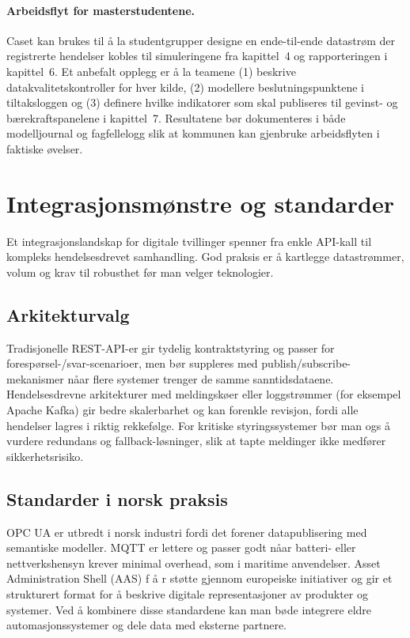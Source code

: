 \paragraph{Arbeidsflyt for masterstudentene.} Caset kan brukes til å la studentgrupper designe en ende-til-ende datastrøm der registrerte hendelser kobles til simuleringene fra kapittel~4 og rapporteringen i kapittel~6. Et anbefalt opplegg er å la teamene (1) beskrive datakvalitetskontroller for hver kilde, (2) modellere beslutningspunktene i tiltaksloggen og (3) definere hvilke indikatorer som skal publiseres til gevinst- og bærekraftspanelene i kapittel~7. Resultatene bør dokumenteres i både modelljournal og fagfellelogg slik at kommunen kan gjenbruke arbeidsflyten i faktiske øvelser.

\section{Integrasjonsmønstre og standarder}
Et integrasjonslandskap for digitale tvillinger spenner fra enkle API-kall til kompleks hendelsesdrevet samhandling. God praksis er  å kartlegge datastrømmer, volum og krav til robusthet før man velger teknologier.

\subsection{Arkitekturvalg}
Tradisjonelle REST-API-er gir tydelig kontraktstyring og passer for forespørsel-/svar-scenarioer, men bør suppleres med publish/subscribe-mekanismer nåar flere systemer trenger de samme sanntidsdataene. Hendelsesdrevne arkitekturer med meldingskøer eller loggstrømmer (for eksempel Apache Kafka) gir bedre skalerbarhet og kan forenkle revisjon, fordi alle hendelser lagres i riktig rekkefølge. For kritiske styringssystemer bør man ogs å vurdere redundans og fallback-løsninger, slik at tapte meldinger ikke medfører sikkerhetsrisiko.

\subsection{Standarder i norsk praksis}
OPC UA er utbredt i norsk industri fordi det forener datapublisering med semantiske modeller. MQTT er lettere og passer godt nåar batteri- eller nettverkshensyn krever minimal overhead, som i maritime anvendelser. Asset Administration Shell (AAS) f å r støtte gjennom europeiske initiativer og gir et strukturert format for  å beskrive digitale representasjoner av produkter og systemer. Ved  å kombinere disse standardene kan man bøde integrere eldre automasjonssystemer og dele data med eksterne partnere.

